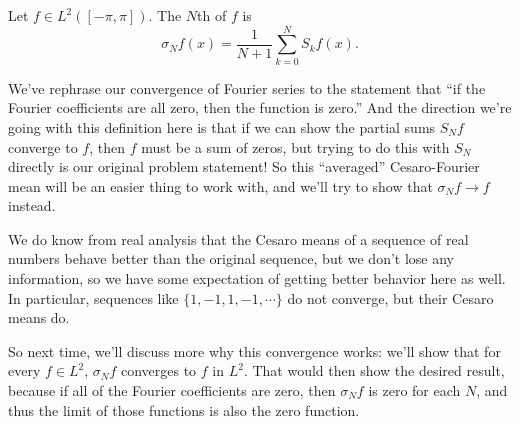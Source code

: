 \begin{definition}
Let $f \in L^2([-\pi, \pi])$. The $N$th  of $f$ is 
\[
    \sigma_Nf(x) = \frac{1}{N+1} \sum_{k=0}^N S_kf(x).
\]
\end{definition}

We've rephrase our convergence of Fourier series to the statement that ``if the Fourier coefficients are all zero, then the function is zero.'' And the direction we're going with this definition here is that if we can show the partial sums $S_Nf$ converge to $f$, then $f$ must be a sum of zeros, but trying to do this with $S_N$ directly is our original problem statement! So this ``averaged'' Cesaro-Fourier mean will be an easier thing to work with, and we'll try to show that $\sigma_Nf \to f$ instead. 

\begin{remark}
We do know from real analysis that the Cesaro means of a sequence of real numbers behave better than the original sequence, but we don't lose any information, so we have some expectation of getting better behavior here as well. In particular, sequences like $\{1, -1, 1, -1, \cdots\}$ do not converge, but their Cesaro means do.
\end{remark}

So next time, we'll discuss more why this convergence works: we'll show that for every $f \in L^2$, $\sigma_N f$ converges to $f$ in $L^2$. That would then show the desired result, because if all of the Fourier coefficients are zero, then $\sigma_N f$ is zero for each $N$, and thus the limit of those functions is also the zero function.